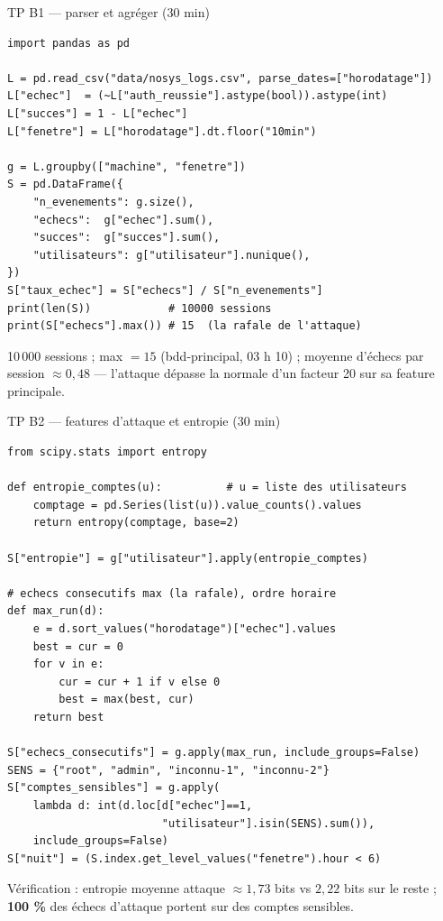 \begin{frame}[fragile]{TP B1 --- parser et agréger (30 min)}
\begin{codebox}
\begin{lstlisting}
import pandas as pd

L = pd.read_csv("data/nosys_logs.csv", parse_dates=["horodatage"])
L["echec"]  = (~L["auth_reussie"].astype(bool)).astype(int)
L["succes"] = 1 - L["echec"]
L["fenetre"] = L["horodatage"].dt.floor("10min")

g = L.groupby(["machine", "fenetre"])
S = pd.DataFrame({
    "n_evenements": g.size(),
    "echecs":  g["echec"].sum(),
    "succes":  g["succes"].sum(),
    "utilisateurs": g["utilisateur"].nunique(),
})
S["taux_echec"] = S["echecs"] / S["n_evenements"]
print(len(S))            # 10000 sessions
print(S["echecs"].max()) # 15  (la rafale de l'attaque)
\end{lstlisting}
\end{codebox}
\vspace{1mm}
\begin{solbox}
10\,000 sessions ; max  $= 15$ (bdd-principal, 03 h 10) ;
moyenne d'échecs par session $\approx 0{,}48$ --- l'attaque dépasse la
normale d'un facteur 20 sur sa feature principale.
\end{solbox}
\end{frame}

\begin{frame}[fragile]{TP B2 --- features d'attaque et entropie (30 min)}
\begin{codebox}
\begin{lstlisting}
from scipy.stats import entropy

def entropie_comptes(u):          # u = liste des utilisateurs
    comptage = pd.Series(list(u)).value_counts().values
    return entropy(comptage, base=2)

S["entropie"] = g["utilisateur"].apply(entropie_comptes)

# echecs consecutifs max (la rafale), ordre horaire
def max_run(d):
    e = d.sort_values("horodatage")["echec"].values
    best = cur = 0
    for v in e:
        cur = cur + 1 if v else 0
        best = max(best, cur)
    return best

S["echecs_consecutifs"] = g.apply(max_run, include_groups=False)
SENS = {"root", "admin", "inconnu-1", "inconnu-2"}
S["comptes_sensibles"] = g.apply(
    lambda d: int(d.loc[d["echec"]==1,
                        "utilisateur"].isin(SENS).sum()),
    include_groups=False)
S["nuit"] = (S.index.get_level_values("fenetre").hour < 6)
\end{lstlisting}
\end{codebox}
\vspace{1mm}
\begin{center}\small
Vérification : entropie moyenne attaque $\approx 1{,}73$ bits vs
$2{,}22$ bits sur le reste ; \textbf{100 \%} des échecs d'attaque portent
sur des comptes sensibles.
\end{center}
\end{frame}

